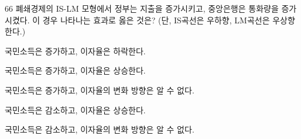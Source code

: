 \begin{question}{66}
폐쇄경제의 IS-LM 모형에서 정부는 지출을 증가시키고, 중앙은행은 통화량을 증가시켰다. 이 경우 나타나는 효과로 옳은 것은? (단, IS곡선은 우하향, LM곡선은 우상향한다.)
\begin{choices}
  \item 국민소득은 증가하고, 이자율은 하락한다.
  \item 국민소득은 증가하고, 이자율은 상승한다.
  \item 국민소득은 증가하고, 이자율의 변화 방향은 알 수 없다.
  \item 국민소득은 감소하고, 이자율은 상승한다.
  \item 국민소득은 감소하고, 이자율의 변화 방향은 알 수 없다.
\end{choices}
\end{question}
